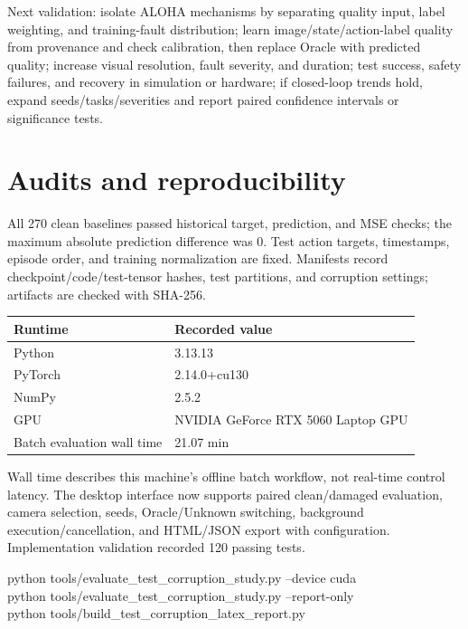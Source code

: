 \documentclass[11pt,a4paper]{article}
\newcommand{\note}[1]{\begin{tcolorbox}[colback=panel,colframe=rule,boxrule=0.5pt,arc=1mm]#1\end{tcolorbox}}
\begin{document}
\note{Next validation: isolate ALOHA mechanisms by separating quality input, label weighting, and training-fault distribution; learn image/state/action-label quality from provenance and check calibration, then replace Oracle with predicted quality; increase visual resolution, fault severity, and duration; test success, safety failures, and recovery in simulation or hardware; if closed-loop trends hold, expand seeds/tasks/severities and report paired confidence intervals or significance tests.}
\clearpage\section{Audits and reproducibility}
All 270 clean baselines passed historical target, prediction, and MSE checks; the maximum absolute prediction difference was 0. Test action targets, timestamps, episode order, and training normalization are fixed. Manifests record checkpoint/code/test-tensor hashes, test partitions, and corruption settings; artifacts are checked with SHA-256.

\begin{center}
\small
\begin{tabular}{lp{102mm}}
\toprule
Runtime & Recorded value \\
\midrule
Python & 3.13.13 \\
PyTorch & 2.14.0+cu130 \\
NumPy & 2.5.2 \\
GPU & NVIDIA GeForce RTX 5060 Laptop GPU \\
Batch evaluation wall time & 21.07 min \\
\bottomrule
\end{tabular}
\end{center}
Wall time describes this machine's offline batch workflow, not real-time control latency. The desktop interface now supports paired clean/damaged evaluation, camera selection, seeds, Oracle/Unknown switching, background execution/cancellation, and HTML/JSON export with configuration. Implementation validation recorded 120 passing tests.

\begin{tcolorbox}[colback=panel,colframe=rule]\small\ttfamily
python tools/evaluate\_test\_corruption\_study.py --device cuda\\
python tools/evaluate\_test\_corruption\_study.py --report-only\\
python tools/build\_test\_corruption\_latex\_report.py
\end{tcolorbox}
\end{document}
